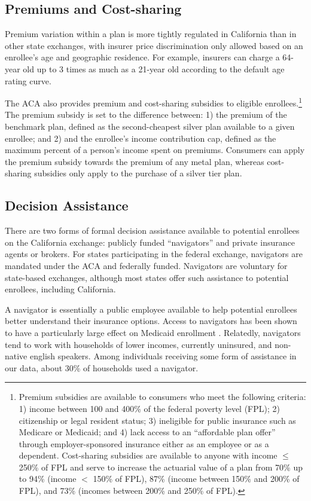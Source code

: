 \documentclass[12pt]{article}
\begin{document}
\subsection{Premiums and Cost-sharing}
Premium variation within a plan is more tightly regulated in California than in other state exchanges, with insurer price discrimination only allowed based on an enrollee's age and geographic residence. For example, insurers can charge a 64-year old up to 3 times as much as a 21-year old according to the default age rating curve.

The ACA also provides premium and cost-sharing subsidies to eligible enrollees.\footnote{Premium subsidies are available to consumers who meet the following criteria: 1) income between 100 and 400\% of the federal poverty level (FPL); 2) citizenship or legal resident status; 3) ineligible for public insurance such as Medicare or Medicaid; and 4) lack access to an ``affordable plan offer'' through employer-sponsored insurance either as an employee or as a dependent. Cost-sharing subsidies are available to anyone with income $\leq$ 250\% of FPL and serve to increase the actuarial value of a plan from 70\% up to 94\% (income $<$ 150\% of FPL), 87\% (income between 150\% and 200\% of FPL), and 73\% (incomes between 200\% and 250\% of FPL).} The premium subsidy is set to the difference between: 1) the premium of the benchmark plan, defined as the second-cheapest silver plan available to a given enrollee; and 2) and the enrollee's income contribution cap, defined as the maximum percent of a person's income spent on premiums. Consumers can apply the premium subsidy towards the premium of any metal plan, whereas cost-sharing subsidies only apply to the purchase of a silver tier plan.

\subsection{Decision Assistance}
There are two forms of formal decision assistance available to potential enrollees on the California exchange: publicly funded ``navigators'' and private insurance agents or brokers. For states participating in the federal exchange, navigators are mandated under the ACA and federally funded. Navigators are voluntary for state-based exchanges, although most states offer such assistance to potential enrollees, including California. 

A navigator is essentially a public employee available to help potential enrollees better understand their insurance options. Access to navigators has been shown to have a particularly large effect on Medicaid enrollment \citep{myerson2019, sommers2015, aizer2003}. Relatedly, navigators tend to work with households of lower incomes, currently uninsured, and non-native english speakers. Among individuals receiving some form of assistance in our data, about 30\% of households used a navigator.
\end{document}
